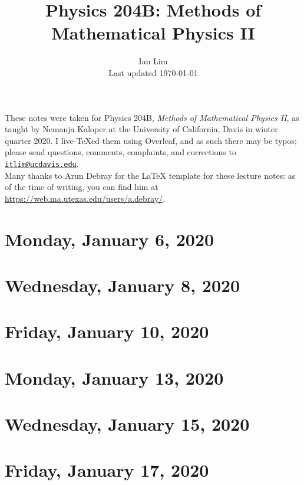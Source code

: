 \documentclass{../mynotes}
\begin{document}
\title{Physics 204B: Methods of Mathematical Physics II}
\author{Ian Lim\\ Last updated \today}
\maketitle
{\small\noindent These notes were taken for Physics 204B, \emph{Methods of Mathematical Physics II}, as taught by Nemanja Kaloper at the University of California, Davis in winter quarter 2020. I live-\TeX ed them using Overleaf, and as such there may be typos; please send questions, comments, complaints, and corrections to 
\href{mailto:itlim@ucdavis.edu?subject=204B\%20Lecture\%20Notes}{\texttt{itlim@ucdavis.edu}}.\\
Many thanks to Arun Debray for the {\LaTeX} template for these lecture notes: as of the time of writing, you can find him at \url{https://web.ma.utexas.edu/users/a.debray/}.}

\tableofcontents

\section{Monday, January 6, 2020}
	
\section{Wednesday, January 8, 2020}
    
\section{Friday, January 10, 2020}
    

\section{Monday, January 13, 2020}
	
\section{Wednesday, January 15, 2020}
    
\section{Friday, January 17, 2020}
    

%     
%     
\end{document}

